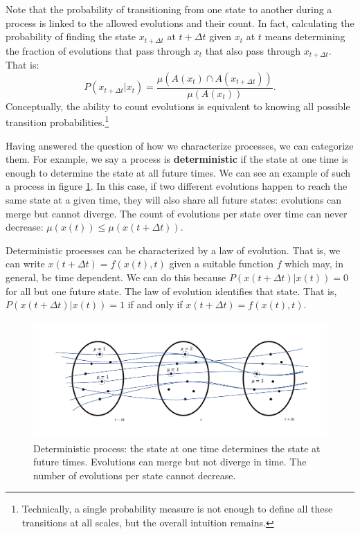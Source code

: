 \documentclass[letterpaper,twocolumn]{article}
\begin{document}
Note that the probability of transitioning from one state to another during a process is linked to the allowed evolutions and their count. In fact, calculating the probability of finding the state $x_{t+\Delta t}$ at $t+\Delta t$ given $x_t$ at $t$ means determining the fraction of evolutions that pass through $x_t$ that also pass through $x_{t+\Delta t}$. That is:
\begin{equation}
	P(x_{t+\Delta t} | x_t) = \frac{\mu(A(x_t) \cap A(x_{t+\Delta t}))}{\mu(A(x_t))}.
\end{equation}
Conceptually, the ability to count evolutions is equivalent to knowing all possible transition probabilities.\footnote{Technically, a single probability measure is not enough to define all these transitions at all scales, but the overall intuition remains.}

Having answered the question of how we characterize processes, we can categorize them. For example, we say a process is \textbf{deterministic} if the state at one time is enough to determine the state at all future times. We can see an example of such a process in figure \ref{fig_determinism}. In this case, if two different evolutions happen to reach the same state at a given time, they will also share all future states: evolutions can merge but cannot diverge. The count of evolutions per state over time can never decrease: $
\mu(x(t)) \leq \mu(x(t + \Delta t))$.

Deterministic processes can be characterized by a law of evolution. That is, we can write $x(t+\Delta t) = f(x(t), t)$ given a suitable function $f$ which may, in general, be time dependent. We can do this because $P(x(t+\Delta t) | x(t)) = 0$ for all but one future state. The law of evolution identifies that state. That is, $P(x(t+\Delta t) | x(t)) = 1$ if and only if $x(t+\Delta t) = f(x(t), t)$.

\begin{figure}[h!]
	\includegraphics[width=\columnwidth]{images/Slide3.png}
	\caption{Deterministic process: the state at one time determines the state at future times. Evolutions can merge but not diverge in time. The number of evolutions per state cannot decrease.}\label{fig_determinism}
\end{figure}
\end{document}
